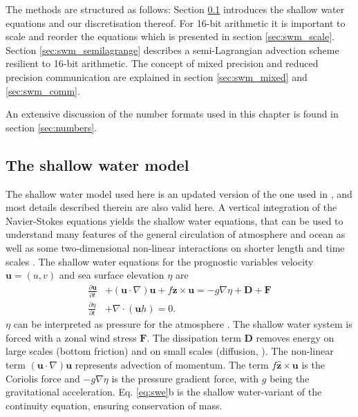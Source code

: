 The methods are structured as follows: Section \ref{sec:swm_swm} introduces the shallow water equations and our
discretisation thereof. For 16-bit arithmetic it is important to scale and reorder the equations which is presented in 
section \ref{sec:swm_scale}. Section \ref{sec:swm_semilagrange} describes a semi-Lagrangian advection scheme
resilient to 16-bit arithmetic. The concept of mixed precision and reduced precision communication are explained
in section \ref{sec:swm_mixed} and \ref{sec:swm_comm}.

An extensive discussion of the number formats used in this chapter is found in section \ref{sec:numbers}.

\subsection{The shallow water model}
\label{sec:swm_swm}

The shallow water model used here is an updated version of the one used in \cite{Klower2019a}, and most details described
therein are also valid here. A vertical integration of the Navier-Stokes equations yields the shallow water equations, that can
be used to understand many features of the general circulation of atmosphere and ocean as well as some two-dimensional
non-linear interactions on shorter length and time scales \citep{Gill1982,Vallis2006}. The shallow water equations for the
prognostic variables velocity $\mathbf{u} = (u,v)$ and sea surface elevation $\eta$ are
\begin{subequations}
\begin{align}
\frac{\partial \mathbf{u}}{\partial t} &+ (\mathbf{u} \cdot \nabla) \mathbf{u} +
f\hat{\mathbf{z}} \times \mathbf{u} = -g\nabla \eta + \mathbf{D} + \mathbf{F} \\
\frac{\partial \eta}{\partial t} &+ \nabla \cdot (\mathbf{u}h) = 0.
\end{align}
\label{eq:swe}%
\end{subequations}
$\eta$ can be interpreted as pressure for the atmosphere \citep{Gill1982}. The shallow water system is forced with a zonal
wind stress $\mathbf{F}$. The dissipation term $\mathbf{D}$ removes energy on large scales (bottom friction) and on small
scales (diffusion, \citep{Griffies2000}). The non-linear term $(\mathbf{u} \cdot \nabla) \mathbf{u}$ represents advection of
momentum. The term $f\hat{\mathbf{z}} \times \mathbf{u}$ is the Coriolis force and $-g\nabla \eta$ is the pressure gradient
force, with $g$ being the gravitational acceleration. Eq. \ref{eq:swe}b is the shallow water-variant of the continuity equation,
ensuring conservation of mass.

